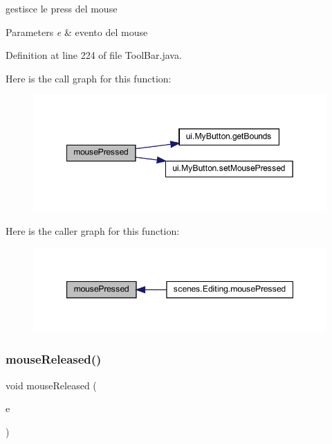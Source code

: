gestisce le press del mouse 


\begin{DoxyParams}{Parameters}
{\em e} & evento del mouse \\
\hline
\end{DoxyParams}


Definition at line 224 of file Tool\+Bar.\+java.

Here is the call graph for this function\+:\nopagebreak
\begin{figure}[H]
\begin{center}
\leavevmode
\includegraphics[width=349pt]{classui_1_1_tool_bar_aed82e1ce3dd3cf283d508c3ba3be70ef_cgraph}
\end{center}
\end{figure}
Here is the caller graph for this function\+:\nopagebreak
\begin{figure}[H]
\begin{center}
\leavevmode
\includegraphics[width=347pt]{classui_1_1_tool_bar_aed82e1ce3dd3cf283d508c3ba3be70ef_icgraph}
\end{center}
\end{figure}
\mbox{\label{classui_1_1_tool_bar_a87a07291794e15052db67f945d90853e}} 
\subsubsection{\texorpdfstring{mouse\+Released()}{mouseReleased()}}
{\footnotesize\ttfamily void mouse\+Released (\begin{DoxyParamCaption}\item[{Mouse\+Event}]{e }\end{DoxyParamCaption})}



